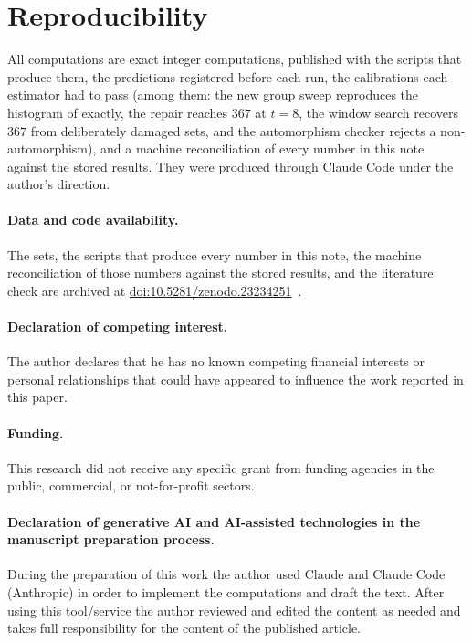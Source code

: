 \section{Reproducibility}
\label{sec:repro}

All computations are exact integer computations, published with the scripts that produce them,
the predictions registered before each run, the calibrations each estimator had to pass (among
them: the new group sweep reproduces the histogram of \cite{oktiabrev2026a} exactly, the repair
reaches $367$ at $t=8$, the window search recovers $367$ from deliberately damaged sets, and the
automorphism checker rejects a non-automorphism), and a machine reconciliation of every number
in this note against the stored results. They were produced through Claude Code under the
author's direction.

\paragraph{Data and code availability.}
The sets, the scripts that produce every number in this note, the machine reconciliation of
those numbers against the stored results, and the literature check are archived at
\href{https://doi.org/10.5281/zenodo.23234251}{doi:10.5281/zenodo.23234251}~\cite{shannonarchive2}.

\paragraph{Declaration of competing interest.}
The author declares that he has no known competing financial interests or personal relationships
that could have appeared to influence the work reported in this paper.

\paragraph{Funding.}
This research did not receive any specific grant from funding agencies in the public, commercial,
or not-for-profit sectors.

\paragraph{Declaration of generative AI and AI-assisted technologies in the manuscript
preparation process.}
During the preparation of this work the author used Claude and Claude Code (Anthropic) in order
to implement the computations and draft the text. After using this tool/service the author
reviewed and edited the content as needed and takes full responsibility for the content of the
published article.
